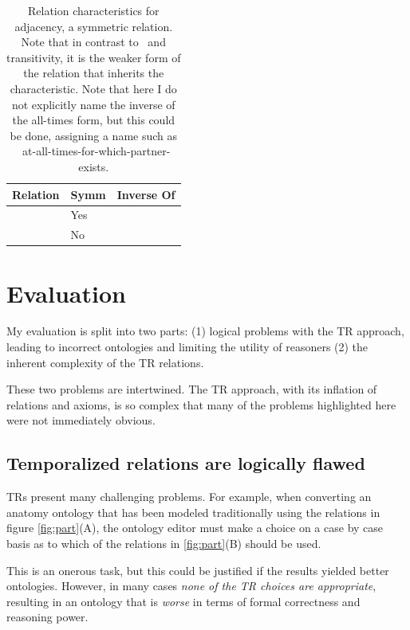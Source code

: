 \documentclass{bioinfo}
\def\partOf{\pr{part\_of}}
\def\adjacentTo{\pr{adjacent\_to}}
\def\atAllTimes{\pr{at-all-times}}
\def\atSomeTimes{\pr{at-some-times}}
\begin{document}
\begin{table}
\begin{tabular}{ | p{3cm} | p{1cm} | p{4cm} | }
\hline
\textbf{Relation} & \textbf{Symm} & \textbf{Inverse Of}  \\
\hline
\adjacentTo\ \atSomeTimes & Yes & \adjacentTo\ \atSomeTimes \\
\hline
\adjacentTo\ \atAllTimes & No & \\
\hline
\end{tabular}
\caption{Relation characteristics for adjacency, a symmetric
  relation. Note that in contrast to \partOf\ and transitivity, it is
  the weaker form of the relation that inherits the
  characteristic. Note that here I do not explicitly name the inverse
  of the all-times form, but this could be done, assigning a name such
  as \adjacentTo\ at-all-times-for-which-partner-exists.}
\label{tab:characteristics-adj}
\end{table}

\section{Evaluation}

My evaluation is split into two parts: (1) logical problems with the
TR approach, leading to incorrect ontologies and limiting the utility
of reasoners (2) the inherent complexity of the TR relations.

These two problems are intertwined. The TR approach, with its inflation
of relations and axioms, is so complex that many of the problems
highlighted here were not immediately obvious.

\subsection{Temporalized relations are logically flawed}

TRs present many challenging problems. For example, when converting an
anatomy ontology that has been modeled traditionally using the
relations in figure \ref{fig:part}(A), the ontology editor must make a
choice on a case by case basis as to which of the relations in
\ref{fig:part}(B) should be used.

This is an onerous task, but this could be justified if the results
yielded better ontologies. However, in many cases \emph{none of the
  TR choices are appropriate}, resulting in an ontology that is
\emph{worse} in terms of formal correctness and reasoning power.
\end{document}

